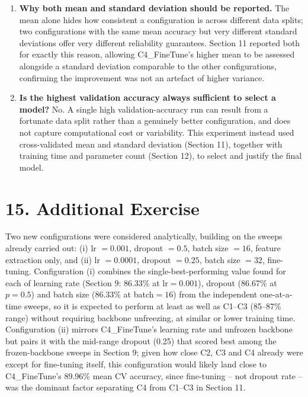 \documentclass[10pt]{article}
\begin{document}
\begin{enumerate}
\item \textbf{Why both mean and standard deviation should be reported.}
The mean alone hides how consistent a configuration is across different
data splits; two configurations with the same mean accuracy but very
different standard deviations offer very different reliability guarantees.
Section 11 reported both for exactly this reason, allowing C4\_FineTune's
higher mean to be assessed alongside a standard deviation comparable to the
other configurations, confirming the improvement was not an artefact of
higher variance.

\item \textbf{Is the highest validation accuracy always sufficient to select a model?}
No. A single high validation-accuracy run can result from a fortunate
data split rather than a genuinely better configuration, and does not
capture computational cost or variability. This experiment instead used
cross-validated mean and standard deviation (Section 11), together with
training time and parameter count (Section 12), to select and justify the
final model.

\end{enumerate}

\section*{15. Additional Exercise}

Two new configurations were considered analytically, building on the
sweeps already carried out: (i) lr $=0.001$, dropout $=0.5$, batch size
$=16$, feature extraction only, and (ii) lr $=0.0001$, dropout $=0.25$,
batch size $=32$, fine-tuning. Configuration (i) combines the
single-best-performing value found for each of learning rate (Section 9:
86.33\% at lr$=0.001$), dropout (86.67\% at $p=0.5$) and batch size
(86.33\% at batch$=16$) from the independent one-at-a-time sweeps, so it is
expected to perform at least as well as C1--C3 (85--87\% range) without
requiring backbone unfreezing, at similar or lower training time.
Configuration (ii) mirrors C4\_FineTune's learning rate and unfrozen
backbone but pairs it with the mid-range dropout (0.25) that scored best
among the frozen-backbone sweeps in Section 9; given how close C2, C3 and
C4 already were except for fine-tuning itself, this configuration would
likely land close to C4\_FineTune's 89.96\% mean CV accuracy, since
fine-tuning -- not dropout rate -- was the dominant factor separating
C4 from C1--C3 in Section 11.
\end{document}
